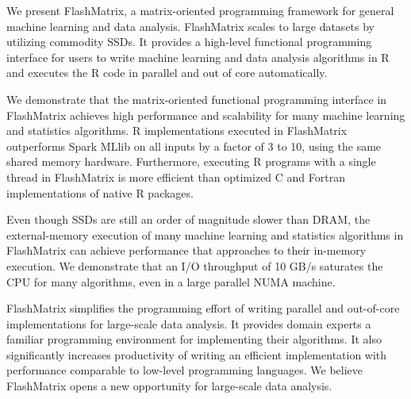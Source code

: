 We present FlashMatrix, a matrix-oriented programming framework for general
machine learning and data analysis. FlashMatrix scales to large datasets by
utilizing commodity SSDs. It provides a high-level functional programming
interface for users to write machine learning and data analysis algorithms
in R and executes the R code in parallel and out of core automatically.

We demonstrate that the matrix-oriented functional programming interface in
FlashMatrix achieves high performance and scalability for many machine learning and 
statistics algorithms.  R implementations executed in FlashMatrix outperforms
Spark MLlib on all inputs by a factor of 3 to 10, using the same shared memory hardware.
Furthermore, executing R programs with a single thread in FlashMatrix is more
efficient than optimized C and Fortran implementations of native R packages.


Even though SSDs are still an order of magnitude slower than DRAM, the external-memory
execution of many machine learning and statistics algorithms in FlashMatrix can achieve performance
that approaches to their in-memory execution. We demonstrate that an I/O throughput
of 10 GB/s saturates the CPU for many algorithms, even in a large parallel
NUMA machine. 

FlashMatrix simplifies the programming effort of writing
parallel and out-of-core implementations for large-scale data analysis. It
provides domain experts a familiar programming environment for implementing
their algorithms. It also significantly
increases productivity of writing an efficient implementation with performance
comparable to low-level programming languages. We believe FlashMatrix opens
a new opportunity for large-scale data analysis.
